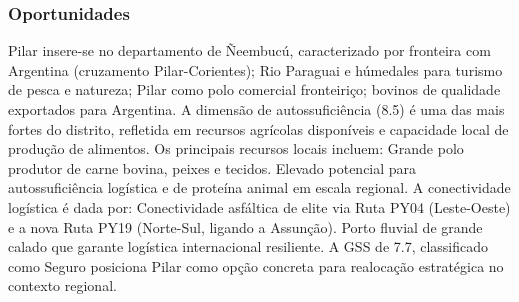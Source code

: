 \newpage

\subsubsection*{Oportunidades}\label{oport-pilar-1201}
Pilar insere-se no departamento de Ñeembucú, caracterizado por fronteira com Argentina (cruzamento Pilar-Corientes); Rio Paraguai e húmedales para turismo de pesca e natureza; Pilar como polo comercial fronteiriço; bovinos de qualidade exportados para Argentina. A dimensão de autossuficiência (8.5) é uma das mais fortes do distrito, refletida em recursos agrícolas disponíveis e capacidade local de produção de alimentos. Os principais recursos locais incluem: Grande polo produtor de carne bovina, peixes e tecidos. Elevado potencial para autossuficiência logística e de proteína animal em escala regional. A conectividade logística é dada por: Conectividade asfáltica de elite via Ruta PY04 (Leste-Oeste) e a nova Ruta PY19 (Norte-Sul, ligando a Assunção). Porto fluvial de grande calado que garante logística internacional resiliente. A GSS de 7.7, classificado como Seguro posiciona Pilar como opção concreta para realocação estratégica no contexto regional.

